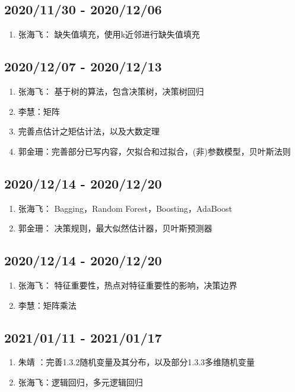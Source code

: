 \documentclass[a4paper,12pt]{article}
\begin{document}
\subsection{2020/11/30 - 2020/12/06}
\begin{enumerate}
    \item 张海飞： 缺失值填充，使用k近邻进行缺失值填充
\end{enumerate}

\subsection{2020/12/07 - 2020/12/13}
\begin{enumerate}
    \item 张海飞： 基于树的算法，包含决策树，决策树回归
    \item 李慧：矩阵
    \item 完善点估计之矩估计法，以及大数定理
    \item 郭金珊：完善部分已写内容，欠拟合和过拟合，(非)参数模型，贝叶斯法则
\end{enumerate}

\subsection{2020/12/14 - 2020/12/20}
\begin{enumerate}
    \item 张海飞： Bagging，Random Forest，Boosting，AdaBoost
    \item 郭金珊： 决策规则，最大似然估计器，贝叶斯预测器
\end{enumerate}


\subsection{2020/12/14 - 2020/12/20}
\begin{enumerate}
    \item 张海飞： 特征重要性，热点对特征重要性的影响，决策边界
    \item 李慧：矩阵乘法
\end{enumerate}

\subsection{2021/01/11 - 2021/01/17}
\begin{enumerate}
    \item 朱靖 ：完善1.3.2随机变量及其分布，以及部分1.3.3多维随机变量
    \item 张海飞：逻辑回归，多元逻辑回归
\end{enumerate}
\end{document}
